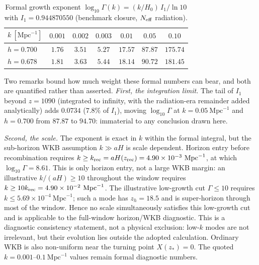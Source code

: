 \begin{table}[t]
\centering\small
\caption{Formal growth exponent $\log_{10}\Gamma(k)=(k/H_0)\,I_1/\ln10$ with $I_1=0.944870550$ (benchmark closure, $N_{\rm eff}$ radiation).}\label{tab:growth}
\begin{tabular}{@{}lcccccc@{}}
\toprule
$k\ [\mathrm{Mpc}^{-1}]$ & $0.001$ & $0.002$ & $0.003$ & $0.01$ & $0.05$ & $0.10$ \\
\midrule
$h=0.700$ & $1.76$ & $3.51$ & $5.27$ & $17.57$ & $87.87$ & $175.74$ \\
$h=0.678$ & $1.81$ & $3.63$ & $5.44$ & $18.14$ & $90.72$ & $181.45$ \\
\bottomrule
\end{tabular}
\end{table}

Two remarks bound how much weight these formal numbers can bear, and both are quantified rather than asserted.
\emph{First, the integration limit.} The tail of $I_1$ beyond $z=1090$ (integrated to infinity, with the radiation-era remainder added analytically) adds $0.0734$ ($7.8\%$ of $I_1$), moving $\log_{10}\Gamma$ at $k=0.05\ \mathrm{Mpc}^{-1}$ and $h=0.700$ from $87.87$ to $94.70$: immaterial to any conclusion drawn here.

\emph{Second, the scale.} The exponent is exact in $k$ within the formal integral, but the sub-horizon WKB assumption $k\gg aH$ is scale dependent. Horizon entry before recombination requires $k\ge k_{\rm rec}=aH(z_{\rm rec})=4.90\times10^{-3}\ \mathrm{Mpc}^{-1}$, at which $\log_{10}\Gamma=8.61$. This is only horizon entry, not a large WKB margin: an illustrative $k/(aH)\ge10$ throughout the window requires $k\ge10k_{\rm rec}=4.90\times10^{-2}\ \mathrm{Mpc}^{-1}$. The illustrative low-growth cut $\Gamma\le10$ requires $k\le5.69\times10^{-4}\ \mathrm{Mpc}^{-1}$; such a mode has $z_h=18.5$ and is super-horizon through most of the window. Hence no scale simultaneously satisfies this low-growth cut and is applicable to the full-window horizon/WKB diagnostic. This is a diagnostic consistency statement, not a physical exclusion: low-$k$ modes are not irrelevant, but their evolution lies outside the adopted calculation. Ordinary WKB is also non-uniform near the turning point $X(z_*)=0$. The quoted $k=0.001$--$0.1\ \mathrm{Mpc}^{-1}$ values remain formal diagnostic numbers.

